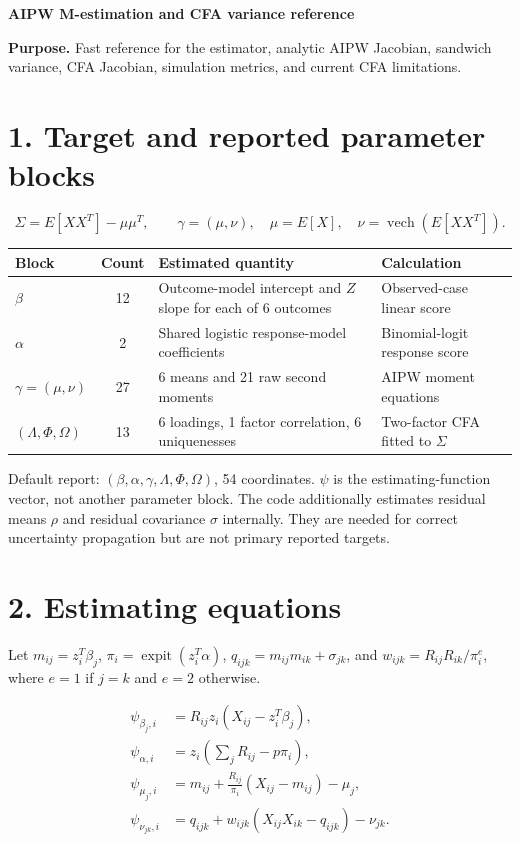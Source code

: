 \documentclass[10pt]{article}
\newcommand{\vech}{\operatorname{vech}}
\begin{document}
{\LARGE\bfseries AIPW M-estimation and CFA variance reference}\par
\smallskip
\textbf{Purpose.} Fast reference for the estimator, analytic AIPW Jacobian, sandwich variance, CFA Jacobian, simulation metrics, and current CFA limitations.

\section*{1. Target and reported parameter blocks}
\[
\Sigma=E[XX^T]-\mu\mu^T,\qquad
\gamma=(\mu,\nu),\quad \mu=E[X],\quad \nu=\vech(E[XX^T]).
\]

\begin{tabularx}{\linewidth}{@{}l c Y Y@{}}
\toprule
Block & Count & Estimated quantity & Calculation \\
\midrule
$\beta$ & 12 & Outcome-model intercept and $Z$ slope for each of 6 outcomes & Observed-case linear score \\
$\alpha$ & 2 & Shared logistic response-model coefficients & Binomial-logit response score \\
$\gamma=(\mu,\nu)$ & 27 & 6 means and 21 raw second moments & AIPW moment equations \\
$(\Lambda,\Phi,\Omega)$ & 13 & 6 loadings, 1 factor correlation, 6 uniquenesses & Two-factor CFA fitted to $\Sigma$ \\
\bottomrule
\end{tabularx}

Default report: $(\beta,\alpha,\gamma,\Lambda,\Phi,\Omega)$, 54 coordinates. $\psi$ is the estimating-function vector, not another parameter block. The code additionally estimates residual means $\rho$ and residual covariance $\sigma$ internally. They are needed for correct uncertainty propagation but are not primary reported targets.

\section*{2. Estimating equations}
Let $m_{ij}=z_i^T\beta_j$, $\pi_i=\operatorname{expit}(z_i^T\alpha)$, $q_{ijk}=m_{ij}m_{ik}+\sigma_{jk}$, and $w_{ijk}=R_{ij}R_{ik}/\pi_i^e$, where $e=1$ if $j=k$ and $e=2$ otherwise.

\begin{align*}
\psi_{\beta_j,i} &= R_{ij}z_i(X_{ij}-z_i^T\beta_j),\\
\psi_{\alpha,i} &= z_i\left(\sum_jR_{ij}-p\pi_i\right),\\
\psi_{\mu_j,i} &= m_{ij}+\frac{R_{ij}}{\pi_i}(X_{ij}-m_{ij})-\mu_j,\\
\psi_{\nu_{jk},i} &= q_{ijk}+w_{ijk}(X_{ij}X_{ik}-q_{ijk})-\nu_{jk}.
\end{align*}
\end{document}
